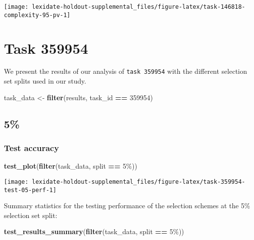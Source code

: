 \documentclass[
]{book}
\newenvironment{Shaded}{\begin{snugshade}}{\end{snugshade}}
\newcommand{\DecValTok}[1]{\textcolor[rgb]{0.00,0.00,0.81}{#1}}
\newcommand{\FunctionTok}[1]{\textcolor[rgb]{0.13,0.29,0.53}{\textbf{#1}}}
\newcommand{\NormalTok}[1]{#1}
\newcommand{\OtherTok}[1]{\textcolor[rgb]{0.56,0.35,0.01}{#1}}
\newcommand{\SpecialCharTok}[1]{\textcolor[rgb]{0.81,0.36,0.00}{\textbf{#1}}}
\newcommand{\StringTok}[1]{\textcolor[rgb]{0.31,0.60,0.02}{#1}}
\begin{document}
\texttt{[image: lexidate-holdout-supplemental\_files/figure-latex/task-146818-complexity-95-pv-1]}

\hypertarget{task-359954}{%
\chapter{Task 359954}\label{task-359954}}

We present the results of our analysis of \texttt{task\ 359954} with the different selection set splits used in our study.

\begin{Shaded}
\begin{Highlighting}[]
\NormalTok{task\_data }\OtherTok{\textless{}{-}} \FunctionTok{filter}\NormalTok{(results, task\_id }\SpecialCharTok{==} \DecValTok{359954}\NormalTok{)}
\end{Highlighting}
\end{Shaded}

\hypertarget{section-5}{%
\section{5\%}\label{section-5}}

\hypertarget{test-accuracy-5}{%
\subsection{Test accuracy}\label{test-accuracy-5}}

\begin{Shaded}
\begin{Highlighting}[]
\FunctionTok{test\_plot}\NormalTok{(}\FunctionTok{filter}\NormalTok{(task\_data, split }\SpecialCharTok{==} \StringTok{\textquotesingle{}5\%\textquotesingle{}}\NormalTok{))}
\end{Highlighting}
\end{Shaded}

\texttt{[image: lexidate-holdout-supplemental\_files/figure-latex/task-359954-test-05-perf-1]}

Summary statistics for the testing performance of the selection schemes at the 5\% selection set split:

\begin{Shaded}
\begin{Highlighting}[]
\FunctionTok{test\_results\_summary}\NormalTok{(}\FunctionTok{filter}\NormalTok{(task\_data, split }\SpecialCharTok{==} \StringTok{\textquotesingle{}5\%\textquotesingle{}}\NormalTok{))}
\end{Highlighting}
\end{Shaded}
\end{document}
